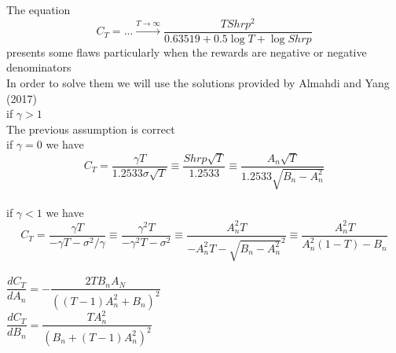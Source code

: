 \documentclass[parskip=full]{scrartcl}
\begin{document}
The equation $$ C_T  = ... \xrightarrow{T \to \infty}  \dfrac{TShrp^2}{0.63519 + 0.5\log T + \log Shrp}$$ presents some flaws particularly when the rewards are negative or negative denominators\\

In order to solve them we will use the solutions provided by Almahdi and Yang (2017)\\

if $ \gamma > 1 $\\

The previous assumption is correct\\

if $ \gamma = 0 $ we have\\

$$C_T  = \dfrac{\gamma T}{1.2533\sigma\sqrt{T}} \equiv \dfrac{Shrp\sqrt{T}}{1.2533} \equiv   \dfrac{A_n\sqrt{T}}{1.2533\sqrt{B_n - A_{n}^{2}}} $$\\


if $ \gamma < 1 $ we have\\

$$C_T  = \dfrac{\gamma T}{-\gamma T - \sigma^2/\gamma} \equiv \dfrac{\gamma^2T}{-\gamma^2T - \sigma^2} \equiv   \dfrac{A_n^2T}{-A_n^2T-\sqrt{B_n - A_{n}^{2}}^2} \equiv \dfrac{A_n^2T}{A_n^2(1-T)-B_n}$$\\

$\dfrac{dC_T}{dA_n} =-\dfrac{2TB_nA_N}{\left(\left(T-1\right)A_{n}^{2}+B_n\right)^2}
$\\

$\dfrac{dC_T}{dB_n} =\dfrac{TA_{n}^{2}}{\left(B_n+\left(T-1\right)A_{n}^{2}\right)^2}
$\\



\end{document}
